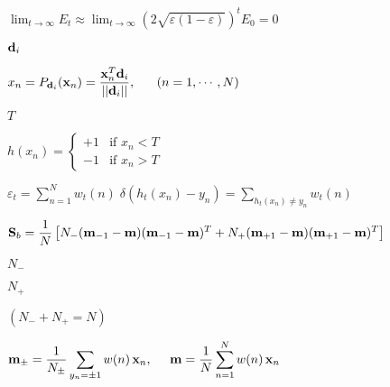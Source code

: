 \documentclass{article}
\def\lthtmlcheckvsize{\ifdim\ht\sizebox<\vsize 
  \ifdim\wd\sizebox<\hsize\expandafter\hfill\fi \expandafter\vfill
  \else\expandafter\vss\fi}%
\begin{document}
{\newpage\clearpage
{}%
$\displaystyle \lim_{t\rightarrow\infty}E_t\approx
\lim_{t\rightarrow\infty}\left(2\sqrt{\varepsilon(1-\varepsilon)}\right)^t E_0=0$%
\lthtmlindisplaymathZ
\lthtmlcheckvsize\clearpage}

{\newpage\clearpage
{}%
$ {\bf d}_i$%
\lthtmlindisplaymathZ
\lthtmlcheckvsize\clearpage}

{\newpage\clearpage
{}%
$\displaystyle x_n=P_{{\bf d}_i}({\bf x}_n)=\frac{{\bf x}_n^T{\bf d}_i}{||{\bf d}_i||},
\;\;\;\;\;\;(n=1,\cdots,N)$%
\lthtmlindisplaymathZ
\lthtmlcheckvsize\clearpage}

{\newpage\clearpage
{}%
$ T$%
\lthtmlindisplaymathZ
\lthtmlcheckvsize\clearpage}

{\newpage\clearpage
{}%
$\displaystyle h(x_n)=\left\{\begin{array}{ll}+1& \mbox{if }x_n<T\\-1 & \mbox{if }x_n>T
\end{array}\right.$%
\lthtmlindisplaymathZ
\lthtmlcheckvsize\clearpage}

{\newpage\clearpage
{}%
$\displaystyle \varepsilon_t=\sum_{n=1}^N w_t(n)\; \delta(h_t(x_n)-y_n)
=\sum_{h_t(x_n)\ne y_n} w_t(n)$%
\lthtmlindisplaymathZ
\lthtmlcheckvsize\clearpage}

{\newpage\clearpage
{}%
$\displaystyle {\bf S}_b=\frac{1}{N}\left[N_-({\bf m}_{-1}-{\bf m})({\bf m}_{-1}-{\bf m})^T
+N_+({\bf m}_{+1}-{\bf m})({\bf m}_{+1}-{\bf m})^T\right]$%
\lthtmlindisplaymathZ
\lthtmlcheckvsize\clearpage}

{\newpage\clearpage
{}%
$ N_-$%
\lthtmlindisplaymathZ
\lthtmlcheckvsize\clearpage}

{\newpage\clearpage
{}%
$ N_+$%
\lthtmlindisplaymathZ
\lthtmlcheckvsize\clearpage}

{\newpage\clearpage
{}%
$ (N_-+N_+=N)$%
\lthtmlindisplaymathZ
\lthtmlcheckvsize\clearpage}

{\newpage\clearpage
{}%
$\displaystyle {\bf m}_{\pm}=\frac{1}{N_{\pm}}\sum_{y_n=\pm 1} w(n)\,{\bf x}_n,
\;\;\;\;\; {\bf m}=\frac{1}{N}\sum_{n=1}^N w(n)\,{\bf x}_n$%
\lthtmlindisplaymathZ
\lthtmlcheckvsize\clearpage}
\end{document}
